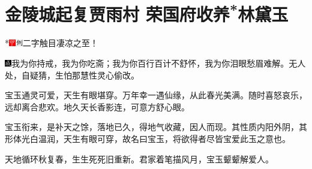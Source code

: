 

\chapter{金陵城起复贾雨村 荣国府收养\textsuperscript{*}林黛玉}

*{\includegraphics[width=3mm]{../Images/00002}\includegraphics[width=3mm]{../Images/00011}\footnotesize \kaishu 二字触目凄凉之至！}

{\includegraphics[width=3mm]{../Images/00005}\kaishu  我为你持戒，我为你吃斋；我为你百行百计不舒怀，我为你泪眼愁眉难解。无人处，自疑猜，生怕那慧性灵心偷改。}

{\kaishu 宝玉通灵可爱，天生有眼堪穿。万年幸一遇仙缘，从此春光美满。随时喜怒哀乐，远却离合悲欢。地久天长香影连，可意方舒心眼。}

{\kaishu 宝玉衔来，是补天之馀，落地已久，得地气收藏，因人而现。其性质内阳外阴，其形体光白温润，天生有眼可穿，故名曰宝玉，将欲得者尽皆宝爱此玉之意也。}

{\kaishu 天地循环秋复春，生生死死旧重新。君家着笔描风月，宝玉颦颦解爱人。}

